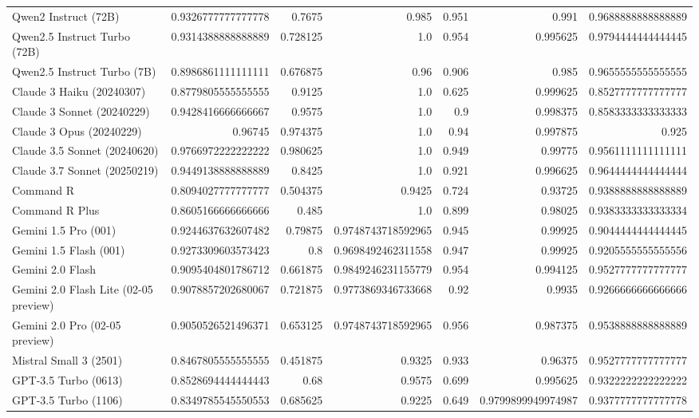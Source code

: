 \begin{table}[htp]
{\begin{tabular}{lrrrrrr}
Qwen2 Instruct (72B) & 0.9326777777777778 & 0.7675 & 0.985 & 0.951 & 0.991 & 0.9688888888888889 \\
Qwen2.5 Instruct Turbo (72B) & 0.9314388888888889 & 0.728125 & 1.0 & 0.954 & 0.995625 & 0.9794444444444445 \\
Qwen2.5 Instruct Turbo (7B) & 0.8986861111111111 & 0.676875 & 0.96 & 0.906 & 0.985 & 0.9655555555555555 \\
Claude 3 Haiku (20240307) & 0.8779805555555555 & 0.9125 & 1.0 & 0.625 & 0.999625 & 0.8527777777777777 \\
Claude 3 Sonnet (20240229) & 0.9428416666666667 & 0.9575 & 1.0 & 0.9 & 0.998375 & 0.8583333333333333 \\
Claude 3 Opus (20240229) & 0.96745 & 0.974375 & 1.0 & 0.94 & 0.997875 & 0.925 \\
Claude 3.5 Sonnet (20240620) & 0.9766972222222222 & 0.980625 & 1.0 & 0.949 & 0.99775 & 0.9561111111111111 \\
Claude 3.7 Sonnet (20250219) & 0.9449138888888889 & 0.8425 & 1.0 & 0.921 & 0.996625 & 0.9644444444444444 \\
Command R & 0.8094027777777777 & 0.504375 & 0.9425 & 0.724 & 0.93725 & 0.9388888888888889 \\
Command R Plus & 0.8605166666666666 & 0.485 & 1.0 & 0.899 & 0.98025 & 0.9383333333333334 \\
Gemini 1.5 Pro (001) & 0.9244637632607482 & 0.79875 & 0.9748743718592965 & 0.945 & 0.99925 & 0.9044444444444445 \\
Gemini 1.5 Flash (001) & 0.9273309603573423 & 0.8 & 0.9698492462311558 & 0.947 & 0.99925 & 0.9205555555555556 \\
Gemini 2.0 Flash & 0.9095404801786712 & 0.661875 & 0.9849246231155779 & 0.954 & 0.994125 & 0.9527777777777777 \\
Gemini 2.0 Flash Lite (02-05 preview) & 0.9078857202680067 & 0.721875 & 0.9773869346733668 & 0.92 & 0.9935 & 0.9266666666666666 \\
Gemini 2.0 Pro (02-05 preview) & 0.9050526521496371 & 0.653125 & 0.9748743718592965 & 0.956 & 0.987375 & 0.9538888888888889 \\
Mistral Small 3 (2501) & 0.8467805555555555 & 0.451875 & 0.9325 & 0.933 & 0.96375 & 0.9527777777777777 \\
GPT-3.5 Turbo (0613) & 0.8528694444444443 & 0.68 & 0.9575 & 0.699 & 0.995625 & 0.9322222222222222 \\
GPT-3.5 Turbo (1106) & 0.8349785545550553 & 0.685625 & 0.9225 & 0.649 & 0.9799899949974987 & 0.9377777777777778 \\

\end{tabular}}
\end{table}
